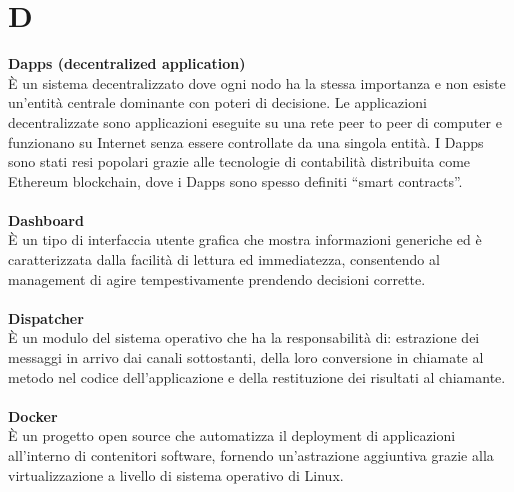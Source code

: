 \section{D}
\textbf{Dapps (decentralized application)}\\
È un sistema decentralizzato dove ogni nodo ha la stessa importanza e non esiste un'entità centrale dominante con poteri di decisione. Le applicazioni decentralizzate sono applicazioni eseguite su una rete peer to peer di computer e funzionano su Internet senza essere controllate da una singola entità. I Dapps sono stati resi popolari grazie alle tecnologie di contabilità distribuita come Ethereum blockchain, dove i Dapps sono spesso definiti “smart contracts”. \\ \\
\textbf{Dashboard}\\
È un tipo di interfaccia utente grafica che mostra informazioni generiche ed è caratterizzata dalla facilità di lettura ed immediatezza, consentendo al management di agire tempestivamente prendendo decisioni corrette. \\ \\
\textbf{Dispatcher}\\
È un modulo del sistema operativo che ha la responsabilità di: estrazione dei messaggi in arrivo dai canali sottostanti, della loro conversione in chiamate al metodo nel codice dell'applicazione e della restituzione dei risultati al chiamante. \\ \\
\textbf{Docker}\\
È un progetto open source che automatizza il deployment di applicazioni all'interno di contenitori software, fornendo un'astrazione aggiuntiva grazie alla virtualizzazione a livello di sistema operativo di Linux. \\ \\
\clearpage